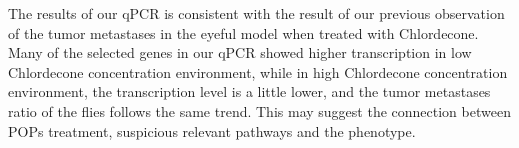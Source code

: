 The results of our qPCR is consistent with the result of our previous observation of the tumor metastases in the eyeful model when treated with Chlordecone. Many of the selected genes in our qPCR showed higher transcription in low Chlordecone concentration environment, while in high Chlordecone concentration environment, the transcription level is a little lower, and the tumor metastases ratio of the flies follows the same trend. This may suggest the connection between POPs treatment, suspicious relevant pathways and the phenotype.